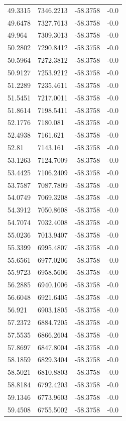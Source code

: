 \begin{table}[H]
\begin{tabular}{llll}
49.3315 & 7346.2213 & -58.3758 & -0.0 \\
49.6478 & 7327.7613 & -58.3758 & -0.0 \\
49.964 & 7309.3013 & -58.3758 & -0.0 \\
50.2802 & 7290.8412 & -58.3758 & -0.0 \\
50.5964 & 7272.3812 & -58.3758 & -0.0 \\
50.9127 & 7253.9212 & -58.3758 & -0.0 \\
51.2289 & 7235.4611 & -58.3758 & -0.0 \\
51.5451 & 7217.0011 & -58.3758 & -0.0 \\
51.8614 & 7198.5411 & -58.3758 & -0.0 \\
52.1776 & 7180.081 & -58.3758 & -0.0 \\
52.4938 & 7161.621 & -58.3758 & -0.0 \\
52.81 & 7143.161 & -58.3758 & -0.0 \\
53.1263 & 7124.7009 & -58.3758 & -0.0 \\
53.4425 & 7106.2409 & -58.3758 & -0.0 \\
53.7587 & 7087.7809 & -58.3758 & -0.0 \\
54.0749 & 7069.3208 & -58.3758 & -0.0 \\
54.3912 & 7050.8608 & -58.3758 & -0.0 \\
54.7074 & 7032.4008 & -58.3758 & -0.0 \\
55.0236 & 7013.9407 & -58.3758 & -0.0 \\
55.3399 & 6995.4807 & -58.3758 & -0.0 \\
55.6561 & 6977.0206 & -58.3758 & -0.0 \\
55.9723 & 6958.5606 & -58.3758 & -0.0 \\
56.2885 & 6940.1006 & -58.3758 & -0.0 \\
56.6048 & 6921.6405 & -58.3758 & -0.0 \\
56.921 & 6903.1805 & -58.3758 & -0.0 \\
57.2372 & 6884.7205 & -58.3758 & -0.0 \\
57.5535 & 6866.2604 & -58.3758 & -0.0 \\
57.8697 & 6847.8004 & -58.3758 & -0.0 \\
58.1859 & 6829.3404 & -58.3758 & -0.0 \\
58.5021 & 6810.8803 & -58.3758 & -0.0 \\
58.8184 & 6792.4203 & -58.3758 & -0.0 \\
59.1346 & 6773.9603 & -58.3758 & -0.0 \\
59.4508 & 6755.5002 & -58.3758 & -0.0 \\

\end{tabular}
\end{table}
